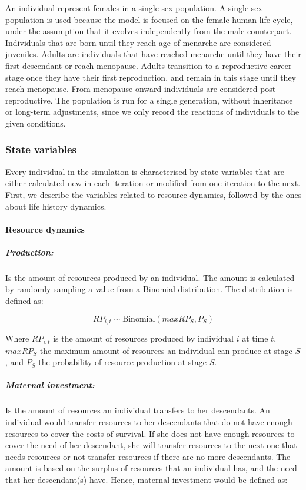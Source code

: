 \documentclass{article}
\begin{document}
An individual represent females in a single-sex population. A single-sex population is used because the model is focused on the female human life cycle, under the assumption that it evolves independently from the male counterpart. Individuals that are born until they reach age of menarche are considered juveniles. Adults are individuals that have reached menarche until they have their first descendant or reach menopause. Adults transition to a reproductive-career stage once they have their first reproduction, and remain in this stage until they reach menopause. From menopause onward individuals are considered post-reproductive. The population is run for a single generation, without inheritance or long-term adjustments, since we only record the reactions of individuals to the given conditions.

\subsubsection{State variables}

Every individual in the simulation is characterised by state variables that are either calculated new in each iteration or modified from one iteration to the next. First, we describe the variables related to resource dynamics, followed by the ones about life history dynamics.

\paragraph{Resource dynamics}

\subparagraph{Production:}

Is the amount of resources produced by an individual. The amount is calculated by randomly sampling a value from a Binomial distribution. The distribution is defined as:

\begin{equation}
    RP_{i,t} \sim \text{Binomial}(maxRP_S,P_S)
\end{equation}

Where $RP_{i,t}$ is the amount of resources produced by individual $i$ at time $t$, $maxRP_S$ the maximum amount of resources an individual can produce at stage $S$, and $P_{S}$ the probability of resource production at stage $S$.

\subparagraph{Maternal investment:}

Is the amount of resources an individual transfers to her descendants. An individual would transfer resources to her descendants that do not have enough resources to cover the costs of survival. If she does not have enough resources to cover the need of her descendant, she will transfer resources to the next one that needs resources or not transfer resources if there are no more descendants. The amount is based on the surplus of resources that an individual has, and the need that her descendant(s) have. Hence, maternal investment would be defined as:
\end{document}
